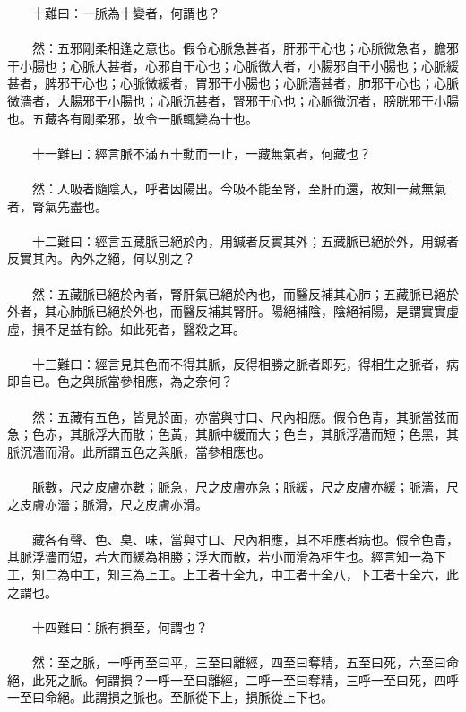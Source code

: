 　　十難曰：一脈為十變者，何謂也？
\\\\
　　然：五邪剛柔相逢之意也。假令心脈急甚者，肝邪干心也；心脈微急者，膽邪干小腸也；心脈大甚者，心邪自干心也；心脈微大者，小腸邪自干小腸也；心脈緩甚者，脾邪干心也；心脈微緩者，胃邪干小腸也；心脈濇甚者，肺邪干心也；心脈微濇者，大腸邪干小腸也；心脈沉甚者，腎邪干心也；心脈微沉者，膀胱邪干小腸也。五藏各有剛柔邪，故令一脈輒變為十也。
\\\\
　　十一難曰：經言脈不滿五十動而一止，一藏無氣者，何藏也？
\\\\
　　然：人吸者隨陰入，呼者因陽出。今吸不能至腎，至肝而還，故知一藏無氣者，腎氣先盡也。
\\\\
　　十二難曰：經言五藏脈已絕於內，用鍼者反實其外；五藏脈已絕於外，用鍼者反實其內。內外之絕，何以別之？
\\\\
　　然：五藏脈已絕於內者，腎肝氣已絕於內也，而醫反補其心肺；五藏脈已絕於外者，其心肺脈已絕於外也，而醫反補其腎肝。陽絕補陰，陰絕補陽，是謂實實虛虛，損不足益有餘。如此死者，醫殺之耳。
\\\\
　　十三難曰：經言見其色而不得其脈，反得相勝之脈者即死，得相生之脈者，病即自已。色之與脈當參相應，為之奈何？
\\\\
　　然：五藏有五色，皆見於面，亦當與寸口、尺內相應。假令色青，其脈當弦而急；色赤，其脈浮大而散；色黃，其脈中緩而大；色白，其脈浮濇而短；色黑，其脈沉濇而滑。此所謂五色之與脈，當參相應也。
\\\\
　　脈數，尺之皮膚亦數；脈急，尺之皮膚亦急；脈緩，尺之皮膚亦緩；脈濇，尺之皮膚亦濇；脈滑，尺之皮膚亦滑。
\\\\
　　藏各有聲、色、臭、味，當與寸口、尺內相應，其不相應者病也。假令色青，其脈浮濇而短，若大而緩為相勝；浮大而散，若小而滑為相生也。經言知一為下工，知二為中工，知三為上工。上工者十全九，中工者十全八，下工者十全六，此之謂也。
\\\\
　　十四難曰：脈有損至，何謂也？
\\\\
　　然：至之脈，一呼再至曰平，三至曰離經，四至曰奪精，五至曰死，六至曰命絕，此死之脈。何謂損？一呼一至曰離經，二呼一至曰奪精，三呼一至曰死，四呼一至曰命絕。此謂損之脈也。至脈從下上，損脈從上下也。
\\\\

